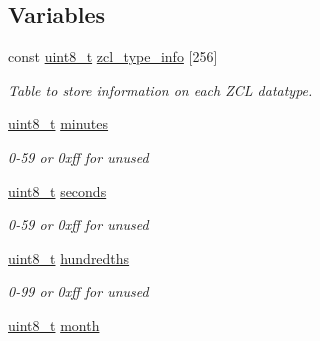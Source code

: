 \subsection*{Variables}
\begin{DoxyCompactItemize}
\item 
const \hyperlink{group__hal__dos_gae1affc9ca37cfb624959c866a73f83c2}{uint8\+\_\+t} \hyperlink{group__zcl__types_ga0f5737f60f1f37fb3b375e9fd5fe664d}{zcl\+\_\+type\+\_\+info} \mbox{[}256\mbox{]}
\begin{DoxyCompactList}\small\item\em Table to store information on each Z\+CL datatype. \end{DoxyCompactList}\item 
\mbox{\label{group__zcl__types_ga7acca8be0094a19be6e308ac05924c4f}} 
\hyperlink{group__hal__dos_gae1affc9ca37cfb624959c866a73f83c2}{uint8\+\_\+t} \hyperlink{group__zcl__types_ga7acca8be0094a19be6e308ac05924c4f}{minutes}
\begin{DoxyCompactList}\small\item\em 0-\/59 or 0xff for unused \end{DoxyCompactList}\item 
\mbox{\label{group__zcl__types_ga46729a903be1a03cdb248fb48d84d4f5}} 
\hyperlink{group__hal__dos_gae1affc9ca37cfb624959c866a73f83c2}{uint8\+\_\+t} \hyperlink{group__zcl__types_ga46729a903be1a03cdb248fb48d84d4f5}{seconds}
\begin{DoxyCompactList}\small\item\em 0-\/59 or 0xff for unused \end{DoxyCompactList}\item 
\mbox{\label{group__zcl__types_gaa9acbdd2fcf00f83919be503371fc8a2}} 
\hyperlink{group__hal__dos_gae1affc9ca37cfb624959c866a73f83c2}{uint8\+\_\+t} \hyperlink{group__zcl__types_gaa9acbdd2fcf00f83919be503371fc8a2}{hundredths}
\begin{DoxyCompactList}\small\item\em 0-\/99 or 0xff for unused \end{DoxyCompactList}\item 
\mbox{\label{group__zcl__types_ga3e00faf7fbf9805e9ec4d2edd6339050}} 
\hyperlink{group__hal__dos_gae1affc9ca37cfb624959c866a73f83c2}{uint8\+\_\+t} \hyperlink{group__zcl__types_ga3e00faf7fbf9805e9ec4d2edd6339050}{month}

\end{DoxyCompactItemize}
